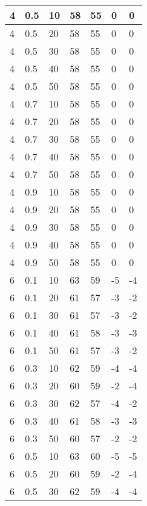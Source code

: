 \begin{longtable}{|l|l|l|l|l|l|l|}
		4     & 0.5 & 10   & 58 & 55 & 0   & 0   \\ \hline
		4     & 0.5 & 20   & 58 & 55 & 0   & 0   \\ \hline
		4     & 0.5 & 30   & 58 & 55 & 0   & 0   \\ \hline
		4     & 0.5 & 40   & 58 & 55 & 0   & 0   \\ \hline
		4     & 0.5 & 50   & 58 & 55 & 0   & 0   \\ \hline
		4     & 0.7 & 10   & 58 & 55 & 0   & 0   \\ \hline
		4     & 0.7 & 20   & 58 & 55 & 0   & 0   \\ \hline
		4     & 0.7 & 30   & 58 & 55 & 0   & 0   \\ \hline
		4     & 0.7 & 40   & 58 & 55 & 0   & 0   \\ \hline
		4     & 0.7 & 50   & 58 & 55 & 0   & 0   \\ \hline
		4     & 0.9 & 10   & 58 & 55 & 0   & 0   \\ \hline
		4     & 0.9 & 20   & 58 & 55 & 0   & 0   \\ \hline
		4     & 0.9 & 30   & 58 & 55 & 0   & 0   \\ \hline
		4     & 0.9 & 40   & 58 & 55 & 0   & 0   \\ \hline
		4     & 0.9 & 50   & 58 & 55 & 0   & 0   \\ \hline
		6     & 0.1 & 10   & 63 & 59 & -5  & -4  \\ \hline
		6     & 0.1 & 20   & 61 & 57 & -3  & -2  \\ \hline
		6     & 0.1 & 30   & 61 & 57 & -3  & -2  \\ \hline
		6     & 0.1 & 40   & 61 & 58 & -3  & -3  \\ \hline
		6     & 0.1 & 50   & 61 & 57 & -3  & -2  \\ \hline
		6     & 0.3 & 10   & 62 & 59 & -4  & -4  \\ \hline
		6     & 0.3 & 20   & 60 & 59 & -2  & -4  \\ \hline
		6     & 0.3 & 30   & 62 & 57 & -4  & -2  \\ \hline
		6     & 0.3 & 40   & 61 & 58 & -3  & -3  \\ \hline
		6     & 0.3 & 50   & 60 & 57 & -2  & -2  \\ \hline
		6     & 0.5 & 10   & 63 & 60 & -5  & -5  \\ \hline
		6     & 0.5 & 20   & 60 & 59 & -2  & -4  \\ \hline
		6     & 0.5 & 30   & 62 & 59 & -4  & -4  \\ \hline

\end{longtable}
